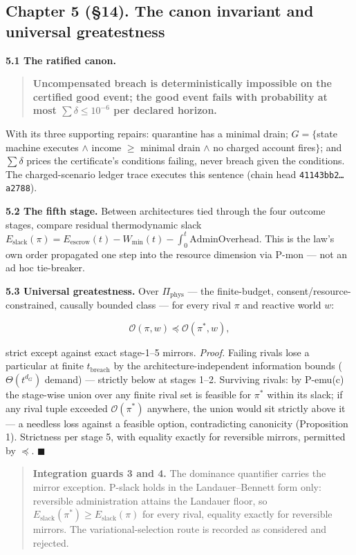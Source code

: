 \documentclass[
]{article}
\begin{document}
\subsection{Chapter 5 (§14). The canon invariant and universal
greatestness}\label{chapter-5-14.-the-canon-invariant-and-universal-greatestness}

\textbf{5.1 The ratified canon.}

\begin{quote}
\textbf{Uncompensated breach is deterministically impossible on the
certified good event; the good event fails with probability at most
\(\sum\delta\le10^{-6}\) per declared horizon.}
\end{quote}

With its three supporting repairs: quarantine has a minimal drain;
\(G=\{\)state machine executes \(\wedge\) income \(\ge\) minimal drain
\(\wedge\) no charged account fires\(\}\); and \(\sum\delta\) prices the
certificate's conditions failing, never breach given the conditions. The
charged-scenario ledger trace executes this sentence (chain head
\texttt{41143bb2…a2788}).

\textbf{5.2 The fifth stage.} Between architectures tied through the
four outcome stages, compare residual thermodynamic slack
\(E_{\mathrm{slack}}(\pi)=E_{\mathrm{escrow}}(t)-W_{\min}(t)-\int_0^t\mathrm{AdminOverhead}\).
This is the law's own order propagated one step into the resource
dimension via P-mon --- not an ad hoc tie-breaker.

\textbf{5.3 Universal greatestness.} Over \(\Pi_{\mathrm{phys}}\) ---
the finite-budget, consent/resource-constrained, causally bounded class
--- for every rival \(\pi\) and reactive world \(w\):

\[
\mathcal O(\pi,w)\preceq\mathcal O(\pi^*,w),
\]

strict except against exact stage-1--5 mirrors. \emph{Proof.} Failing
rivals lose a particular at finite \(t_{\mathrm{breach}}\) by the
architecture-independent information bounds (\(\Theta(t^{d_G})\) demand)
--- strictly below at stages 1--2. Surviving rivals: by P-emu(c) the
stage-wise union over any finite rival set is feasible for \(\pi^*\)
within its slack; if any rival tuple exceeded \(\mathcal O(\pi^*)\)
anywhere, the union would sit strictly above it --- a needless loss
against a feasible option, contradicting canonicity (Proposition 1).
Strictness per stage 5, with equality exactly for reversible mirrors,
permitted by \(\preceq\). \(\blacksquare\)

\begin{quote}
\textbf{Integration guards 3 and 4.} The dominance quantifier carries
the mirror exception. P-slack holds in the Landauer--Bennett form only:
reversible administration attains the Landauer floor, so
\(E_{\mathrm{slack}}(\pi^*)\ge E_{\mathrm{slack}}(\pi)\) for every
rival, equality exactly for reversible mirrors. The
variational-selection route is recorded as considered and rejected.
\end{quote}
\end{document}
